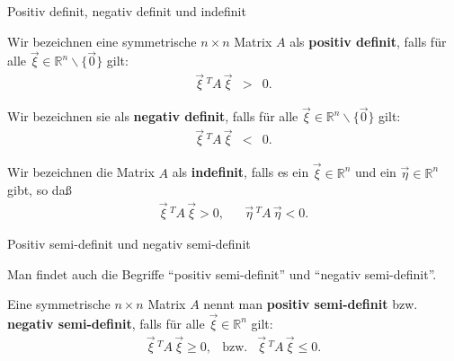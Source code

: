 \documentclass[german]{beamer}
\newcommand{\bq}{\begin{eqnarray*}}
\newcommand{\eq}{\end{eqnarray*}}
\begin{document}
\begin{frame}{Positiv definit, negativ definit und indefinit}

\begin{definition}
Wir bezeichnen eine symmetrische $n \times n$ Matrix $A$ als {\bf positiv definit}, falls
f\"ur alle $\vec{\xi} \in {\mathbb R}^n \backslash \{\vec{0}\}$ gilt:
\bq
 \vec{\xi}\,{}^T A \, \vec{\xi} & > & 0.
\eq
\end{definition}

\begin{definition}
Wir bezeichnen sie als {\bf negativ definit}, falls
f\"ur alle $\vec{\xi} \in {\mathbb R}^n \backslash \{\vec{0}\}$ gilt:
\bq
 \vec{\xi}\,{}^T A \, \vec{\xi} & < & 0.
\eq
\end{definition}

\begin{definition}
Wir bezeichnen die Matrix $A$ als {\bf indefinit}, falls es ein $\vec{\xi} \in {\mathbb R}^n$
und ein $\vec{\eta} \in {\mathbb R}^n$ gibt, so da{\ss}
\bq
 \vec{\xi}\,{}^T A \, \vec{\xi} > 0,
 & &
 \vec{\eta}\,{}^T A \, \vec{\eta} < 0.
\eq
\end{definition}

\end{frame}

\begin{frame}{Positiv semi-definit und negativ semi-definit}

Man findet auch die Begriffe ``positiv semi-definit'' und ``negativ semi-definit''. 

\begin{definition}
Eine symmetrische $n\times n$ Matrix $A$ nennt man {\bf positiv semi-definit} bzw.
{\bf negativ semi-definit}, falls f\"ur alle $\vec{\xi} \in {\mathbb R}^n$ gilt:
\bq
 \vec{\xi}\,{}^T A \, \vec{\xi} \ge 0,
 & \mbox{bzw.} &
 \vec{\xi}\,{}^T A \, \vec{\xi} \le 0.
\eq
\end{definition}

\end{frame}
\end{document}
